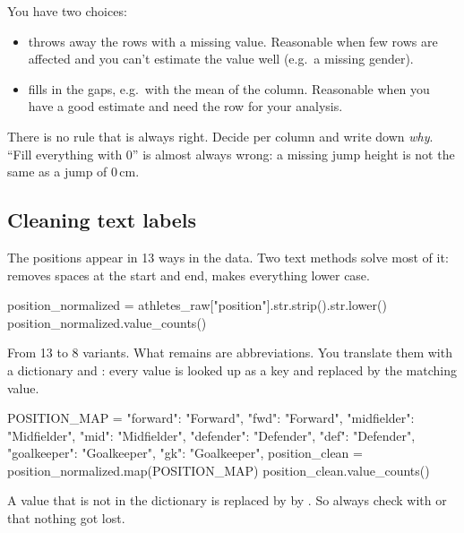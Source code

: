 \documentclass[11pt,a4paper]{article}
\begin{document}
You have two choices:

\begin{itemize}
  \item {} throws away the rows with a missing value.
        Reasonable when few rows are affected and you can't estimate the
        value well (e.g.\ a missing gender).
  \item {} fills in the gaps, e.g.\ with the mean of
        the column. Reasonable when you have a good estimate and need the
        row for your analysis.
\end{itemize}

\begin{keyidea}
There is no rule that is always right. Decide per column and write down
\emph{why}. ``Fill everything with 0'' is almost always wrong: a missing
jump height is not the same as a jump of 0\,cm.
\end{keyidea}

\subsection{Cleaning text labels}

The positions appear in 13 ways in the data. Two text methods solve most
of it:  removes spaces at the start and end,
 makes everything lower case.

\begin{python}
position_normalized = athletes_raw["position"].str.strip().str.lower()
position_normalized.value_counts()
\end{python}

From 13 to 8 variants. What remains are abbreviations. You translate
them with a dictionary and : every value is looked up as
a key and replaced by the matching value.

\begin{python}
POSITION_MAP = {
    "forward": "Forward", "fwd": "Forward",
    "midfielder": "Midfielder", "mid": "Midfielder",
    "defender": "Defender", "def": "Defender",
    "goalkeeper": "Goalkeeper", "gk": "Goalkeeper",
}
position_clean = position_normalized.map(POSITION_MAP)
position_clean.value_counts()
\end{python}

\begin{watchout}
A value that is not in the dictionary is replaced by  by
. So always check with  or
 that nothing got lost.
\end{watchout}
\end{document}
